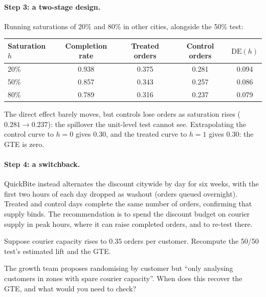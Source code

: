 \documentclass[11pt]{article}
\begin{document}
\paragraph{Step 3: a two-stage design.} Running saturations of 20\% and 80\% in other cities, alongside the 50\% test:
\begin{center}
\begin{tabular}{lcccc}
\toprule
Saturation $h$ & Completion rate & Treated orders & Control orders & $\text{DE}(h)$ \\
\midrule
20\% & 0.938 & 0.375 & 0.281 & 0.094 \\
50\% & 0.857 & 0.343 & 0.257 & 0.086 \\
80\% & 0.789 & 0.316 & 0.237 & 0.079 \\
\bottomrule
\end{tabular}
\end{center}
The direct effect barely moves, but controls lose orders as saturation rises ($0.281 \to 0.237$): the spillover the
unit-level test cannot see. Extrapolating the control curve to $h = 0$ gives $0.30$, and the treated curve to $h = 1$
gives $0.30$: the GTE is zero.

\paragraph{Step 4: a switchback.} QuickBite instead alternates the discount citywide by day for six weeks, with the first
two hours of each day dropped as washout (orders queued overnight). Treated and control days complete the same number
of orders, confirming that supply binds. The recommendation is to spend the discount budget on courier supply in
peak hours, where it can raise completed orders, and to re-test there.

\begin{exercise}[computation]
Suppose courier capacity rises to $0.35$ orders per customer. Recompute the 50/50 test's estimated lift and the GTE.
\end{exercise}

\begin{exercise}[judgement]
The growth team proposes randomising by customer but ``only analysing customers in zones with spare courier
capacity''. When does this recover the GTE, and what would you need to check?
\end{exercise}
\end{document}
